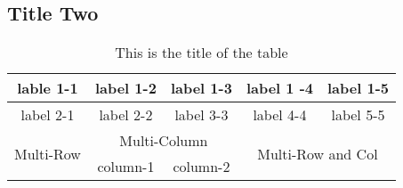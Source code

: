 \documentclass[12pt,a4paper]{article} 								%
\begin{document}
\subsection{Title Two}											    %
\begin{table}[!hbp]													%
\centering															%
\begin{tabular}{|c|c|c|c|c|}										%
\hline																%
lable 1-1 & label 1-2 & label 1-3 & label 1 -4 & label 1-5 \\
\hline
label 2-1 & label 2-2 & label 3-3 & label 4-4 & label 5-5 \\
\hline
\multirow{2}{*}{Multi-Row} & \multicolumn{2}{|c|}{Multi-Column} & \multicolumn{2}{|c|}{\multirow{2}{*}{Multi-Row and Col}} \\
\cline{2-3}
& column-1 & column-2 & \multicolumn{2}{|c|}{}\\
\hline
\end{tabular}
\caption{This is the title of the table}
\end{table}
\end{document}
